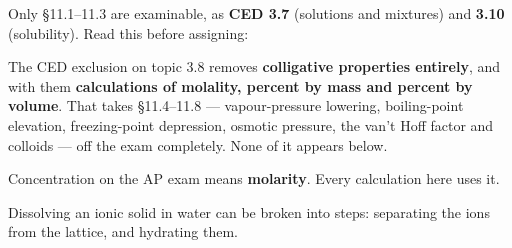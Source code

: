 \documentclass{apchem-exam}
\begin{document}
\apctitleblock

\begin{apcnote}
Only \S11.1--11.3 are examinable, as \textbf{CED 3.7} (solutions and
mixtures) and \textbf{3.10} (solubility). Read this before assigning:

The CED exclusion on topic 3.8 removes \textbf{colligative properties
entirely}, and with them \textbf{calculations of molality, percent by
mass and percent by volume}. That takes \S11.4--11.8 --- vapour-pressure
lowering, boiling-point elevation, freezing-point depression, osmotic
pressure, the van't Hoff factor and colloids --- off the exam completely.
None of it appears below.

Concentration on the AP exam means \textbf{molarity}. Every calculation
here uses it.
\end{apcnote}



Dissolving an ionic solid in water can be broken into steps: separating
the ions from the lattice, and hydrating them.
\end{document}
